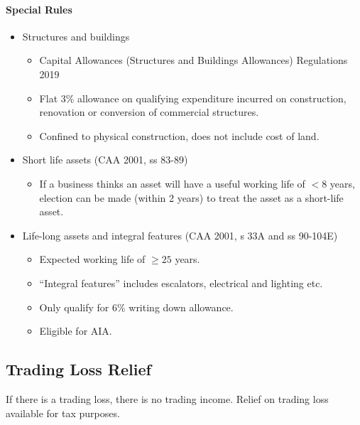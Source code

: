 \documentclass[
]{article}
\providecommand{\tightlist}{%
  \setlength{\itemsep}{0pt}\setlength{\parskip}{0pt}}
\begin{document}
\hypertarget{special-rules}{%
\paragraph{Special Rules}\label{special-rules}}

\begin{itemize}
\tightlist
\item
  Structures and buildings

  \begin{itemize}
  \tightlist
  \item
    Capital Allowances (Structures and Buildings Allowances) Regulations
    2019
  \item
    Flat 3\% allowance on qualifying expenditure incurred on
    construction, renovation or conversion of commercial structures.
  \item
    Confined to physical construction, does not include cost of land.
  \end{itemize}
\item
  Short life assets (CAA 2001, ss 83-89)

  \begin{itemize}
  \tightlist
  \item
    If a business thinks an asset will have a useful working life of
    {\(< 8\)} years, election can be made (within 2 years) to treat the
    asset as a short-life asset.
  \end{itemize}
\item
  Life-long assets and integral features (CAA 2001, s 33A and ss
  90-104E)

  \begin{itemize}
  \tightlist
  \item
    Expected working life of {\(\geq 25\)} years.
  \item
    ``Integral features'' includes escalators, electrical and lighting
    etc.
  \item
    Only qualify for 6\% writing down allowance.
  \item
    Eligible for AIA.
  \end{itemize}
\end{itemize}

\hypertarget{trading-loss-relief}{%
\subsection{Trading Loss Relief}\label{trading-loss-relief}}

If there is a trading loss, there is no trading income. Relief on
trading loss available for tax purposes.
\end{document}
